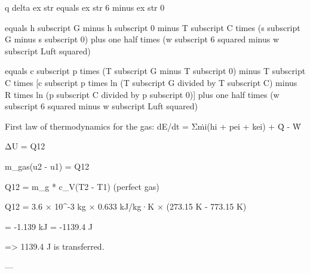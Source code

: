 q delta ex str equals ex str 6 minus ex str 0  

equals h subscript G minus h subscript 0 minus T subscript C times (s subscript G minus s subscript 0) plus one half times (w subscript 6 squared minus w subscript Luft squared)  

equals c subscript p times (T subscript G minus T subscript 0) minus T subscript C times [c subscript p times ln (T subscript G divided by T subscript C) minus R times ln (p subscript C divided by p subscript 0)] plus one half times (w subscript 6 squared minus w subscript Luft squared)

First law of thermodynamics for the gas:  
dE/dt = Σṁi(hi + pei + kei) + Q̇ - Ẇ  

ΔU = Q12  

m_gas(u2 - u1) = Q12  

Q12 = m_g * c_V(T2 - T1) (perfect gas)  

Q12 = 3.6 × 10^-3 kg × 0.633 kJ/kg·K × (273.15 K - 773.15 K)  

= -1.139 kJ = -1139.4 J  

=> 1139.4 J is transferred.  

---